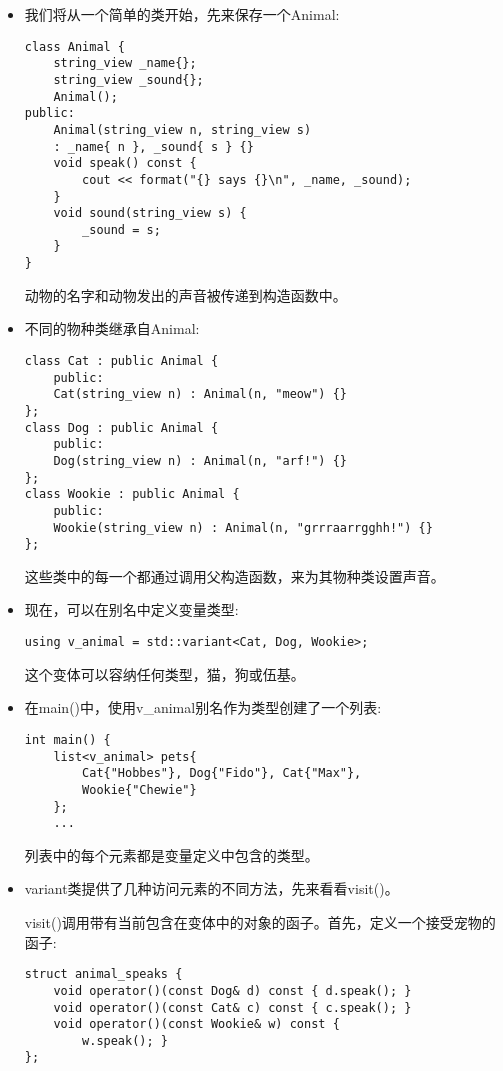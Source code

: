 \begin{itemize}
\item 
我们将从一个简单的类开始，先来保存一个Animal:

\begin{lstlisting}[style=styleCXX]
class Animal {
	string_view _name{};
	string_view _sound{};
	Animal();
public:
	Animal(string_view n, string_view s)
	: _name{ n }, _sound{ s } {}
	void speak() const {
		cout << format("{} says {}\n", _name, _sound);
	}
	void sound(string_view s) {
		_sound = s;
	}
}
\end{lstlisting}

动物的名字和动物发出的声音被传递到构造函数中。

\item 
不同的物种类继承自Animal:

\begin{lstlisting}[style=styleCXX]
class Cat : public Animal {
	public:
	Cat(string_view n) : Animal(n, "meow") {}
};
class Dog : public Animal {
	public:
	Dog(string_view n) : Animal(n, "arf!") {}
};
class Wookie : public Animal {
	public:
	Wookie(string_view n) : Animal(n, "grrraarrgghh!") {}
};
\end{lstlisting}

这些类中的每一个都通过调用父构造函数，来为其物种类设置声音。

\item 
现在，可以在别名中定义变量类型:

\begin{lstlisting}[style=styleCXX]
using v_animal = std::variant<Cat, Dog, Wookie>;
\end{lstlisting}

这个变体可以容纳任何类型，猫，狗或伍基。

\item 
在main()中，使用v\_animal别名作为类型创建了一个列表:

\begin{lstlisting}[style=styleCXX]
int main() {
	list<v_animal> pets{
		Cat{"Hobbes"}, Dog{"Fido"}, Cat{"Max"},
		Wookie{"Chewie"}
	};
	...
\end{lstlisting}

列表中的每个元素都是变量定义中包含的类型。

\item 
variant类提供了几种访问元素的不同方法，先来看看visit()。

visit()调用带有当前包含在变体中的对象的函子。首先，定义一个接受宠物的函子:

\begin{lstlisting}[style=styleCXX]
struct animal_speaks {
	void operator()(const Dog& d) const { d.speak(); }
	void operator()(const Cat& c) const { c.speak(); }
	void operator()(const Wookie& w) const {
		w.speak(); }
};
\end{lstlisting}


\end{itemize}
